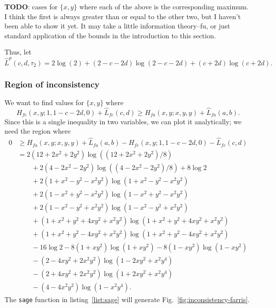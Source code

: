 \documentclass[a4paper]{article}
\begin{document}
\textbf{TODO}: cases for $\{x, y\}$ where each of the above is the corresponding maximum.
I think the first is always greater than or equal to the other two, but I haven't been able to show it yet.
It may take a little information theory--fu, or just standard application of the bounds in the introduction to this section.

Thus, let
$$
\hat{L}^{p}(c,d,\tau_2) = 2\log(2)+(2-c-2d)\log(2-c-2d)+(c+2d)\log(c+2d).
$$

\subsubsection{Region of inconsistency}

We want to find values for $\{x,y\}$ where
$$
H_{fe}(x,y; 1, 1-c-2d, 0) + \hat{L}_{fe}(c,d) \ge H_{fa}(x,y; x, y, y) + \hat{L}_{fa}(a,b).
$$
Since this is a single inequality in two variables, we can plot it analytically; we need the region where
\begin{align*}
    0 &\ge H_{fa}(x,y; x, y, y) + \hat{L}_{fa}(a,b) - H_{fe}(x,y; 1, 1-c-2d, 0) - \hat{L}_{fe}(c,d) \\
      & = 2(12+2x^2+2y^2)\log((12+2x^2+2y^2)/8) \\
      &\qquad + 2(4-2x^2-2y^2)\log((4-2x^2-2y^2)/8)  + 8\log2 \\
      &\qquad + 2(1+x^2-y^2-x^2y^2)\log(1+x^2-y^2-x^2y^2) \\
      &\qquad + 2(1-x^2+y^2-x^2y^2)\log(1-x^2+y^2-x^2y^2) \\
      &\qquad + 2(1-x^2-y^2+x^2y^2)\log(1-x^2-y^2+x^2y^2) \\
      &\qquad + (1+x^2+y^2+4xy^2+x^2y^2)\log(1+x^2+y^2+4xy^2+x^2y^2) \\
      &\qquad + (1+x^2+y^2-4xy^2+x^2y^2)\log(1+x^2+y^2-4xy^2+x^2y^2) \\
      &\qquad - 16\log2 - 8(1+xy^2)\log(1+xy^2) - 8(1-xy^2)\log(1-xy^2) \\
      &\qquad - (2-4xy^2+2x^2y^2)\log(1-2xy^2+x^2y^4) \\
      &\qquad - (2+4xy^2+2x^2y^2)\log(1+2xy^2+x^2y^4) \\
      &\qquad - (4-4x^2y^2)\log(1-x^2y^4).
\end{align*}
The \texttt{sage} function in listing~\ref{list:sage} will generate Fig.~\ref{fig:inconsistency-farris}.
\end{document}

